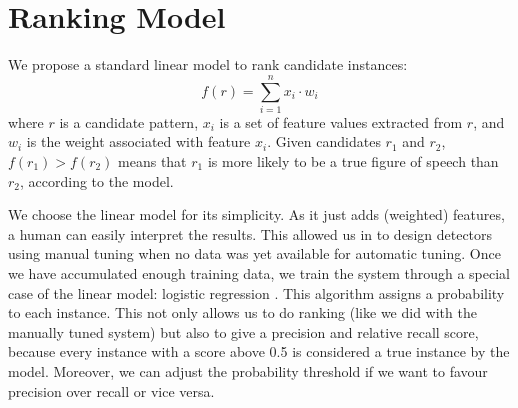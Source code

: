 

\section{Ranking Model}
We propose a standard linear model to rank candidate instances:
\begin{displaymath}
f(r)=\sum\limits_{i=1}^n x_i \cdot w_i
\end{displaymath}
where $r$ is a candidate pattern, $x_i$ is a set of feature values extracted from $r$, and $w_i$ is the weight associated with feature $x_i$. Given candidates $r_1$ and $r_2$, $f(r_1) > f(r_2)$ means that $r_1$ is more likely to be a true figure of speech than $r_2$, according to the model. 

We choose the linear model for its simplicity. As it just adds (weighted) features, a human can easily interpret the results. This allowed us in  to design detectors using manual tuning when no data was yet available for automatic tuning. Once we have accumulated enough training data, we train the system through a special case of the linear model: logistic regression \citep{Pedregosa2011}. This algorithm assigns a probability to each instance. This not only allows us to do ranking (like we did with the manually tuned system) but also to give a precision and relative recall score, because every instance with a score above 0.5 is considered a true instance by the model. Moreover, we can adjust the probability threshold if we want to favour precision over recall or vice versa.



